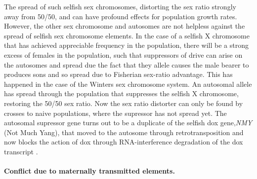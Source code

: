 {The spread of such selfish sex chromosomes, distorting the sex ratio
strongly away from 50/50, and can have profound effects for population
growth rates. However, the other sex chromosome and autosomes are not helpless
against the spread of selfish sex chromosome elements. In the case of
a selfish X chromosome that has achieved appreciable frequency in the population, there will be a strong excess of females
in the population, such that suppressors of drive can arise on the autosomes
and spread due the fact that they allele causes the male bearer to
produces sons and so spread due to Fisherian sex-ratio advantage.
This has happened in the case of the Winters sex chromosome system. An
autosomal allele has spread through the population that suppresses the
selfish X chromosome, restoring the 50/50 sex ratio. Now the sex ratio
distorter can only be found by crosses to naive populations, where the
supressor has not spread yet. The autosomal supressor gene turns out to be
a duplicate of the selfish dox gene,{\it NMY} (Not Much Yang), that moved to the
autosome through retrotransposition and now blocks the action of dox
through RNA-interference degradation of the dox transcript \citep[see
][, see Figure \ref{fig:dox_cartoon}]{tao2007sex}.


\paragraph{Conflict due to maternally transmitted elements.}






}
